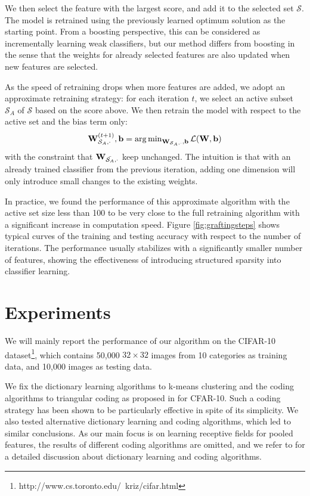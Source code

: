 We then select the feature with the largest score, and add it to the selected set $\mathcal{S}$. The model is retrained using the previously learned optimum solution as the starting point. From a boosting perspective, this can be considered as incrementally learning weak classifiers, but our method differs from boosting in the sense that the weights for already selected features are also updated when new features are selected.

As the speed of retraining drops when more features are added, we adopt an approximate retraining strategy: for each iteration $t$, we select an active subset $\mathcal{S}_{A}$ of $\mathcal{S}$ based on the score above. We then retrain the model with respect to the active set and the bias term only:
\begin{equation}
  \mathbf{W}^{(t+1)}_{\mathcal{S}_A,\cdot}, \mathbf{b} = \operatorname{\arg\min}_{\mathbf{W}_{\mathcal{S}_A,\cdot},\mathbf{b}}\mathcal{L}(\mathbf{W},\mathbf{b})
\end{equation}
with the constraint that $\mathbf{W}_{\bar{\mathcal{S}_A},\cdot}$ keep unchanged. The intuition is that with an already trained classifier from the previous iteration, adding one dimension will only introduce small changes to the existing weights. 

In practice, we found the performance of this approximate algorithm with the active set size less than 100 to be very close to the full retraining algorithm with a significant increase in computation speed. Figure \ref{fig:graftingsteps} shows typical curves of the training and testing accuracy with respect to the number of iterations. The performance usually stabilizes with a significantly smaller number of features, showing the effectiveness of introducing structured sparsity into classifier learning.

\section{Experiments}\label{sec:experiments}
We will mainly report the performance of our algorithm on the CIFAR-10 dataset\footnote{http://www.cs.toronto.edu/~kriz/cifar.html}, which contains 50,000 $32\times32$ images from 10 categories as training data, and 10,000 images as testing data.

We fix the dictionary learning algorithms to k-means clustering and the coding algorithms to triangular coding as proposed in \cite{coates2010aistats} for CFAR-10. Such a coding strategy has been shown to be particularly effective in spite of its simplicity. We also tested alternative dictionary learning and coding algorithms, which led to similar conclusions. As our main focus is on learning receptive fields for pooled features, the results of different coding algorithms are omitted, and we refer to \cite{coates2011icml} for a detailed discussion about dictionary learning and coding algorithms. 

